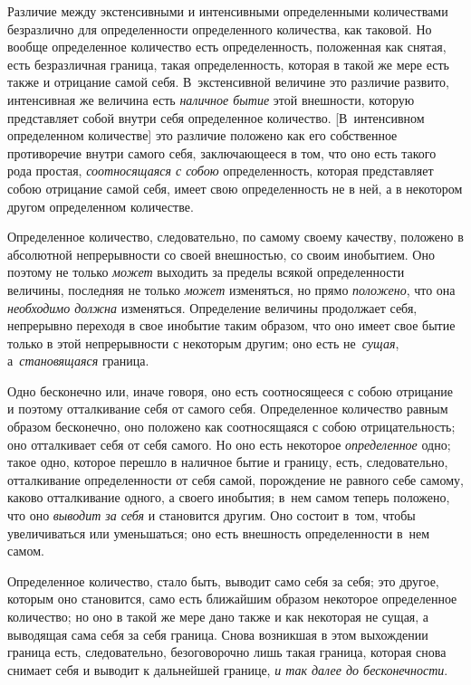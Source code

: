 Различие между экстенсивными и интенсивными определенными количествами
безразлично для определенности определенного количества, как таковой. Но вообще
определенное количество есть определенность, положенная как снятая, есть
безразличная граница, такая определенность, которая в такой же мере есть также
и отрицание самой себя. В~экстенсивной величине это различие развито,
интенсивная же величина есть {\em наличное бытие} этой внешности, которую
представляет собой внутри себя определенное количество. [В~интенсивном
определенном количестве] это различие положено как его собственное противоречие
внутри самого себя, заключающееся в том, что оно есть такого рода простая,
{\em соотносящаяся с собою} определенность, которая представляет собою
отрицание самой себя, имеет свою определенность не в ней, а в некотором другом
определенном количестве.

Определенное количество, следовательно, по самому своему качеству, положено
в абсолютной непрерывности со своей внешностью, со своим инобытием. Оно поэтому
не только {\em может} выходить за пределы всякой определенности величины,
последняя не только {\em может} изменяться, но прямо {\em положено}, что она
{\em необходимо должна} изменяться. Определение величины продолжает себя,
непрерывно переходя в свое инобытие таким образом, что оно имеет свое бытие
только в этой непрерывности с некоторым другим; оно есть не~{\em сущая},
а~{\em становящаяся} граница.

Одно бесконечно или, иначе говоря, оно есть соотносящееся с собою отрицание и
поэтому отталкивание себя от самого себя. Определенное количество равным
образом бесконечно, оно положено как соотносящаяся с собою отрицательность; оно
отталкивает себя от себя самого. Но оно есть некоторое {\em определенное} одно;
такое одно, которое перешло в наличное бытие и границу, есть, следовательно,
отталкивание определенности от себя самой, порождение не равного себе самому,
каково отталкивание одного, а своего инобытия; в~нем самом теперь положено, что
оно {\em выводит за себя} и становится другим. Оно состоит в~том, чтобы
увеличиваться или уменьшаться; оно есть внешность определенности в~нем самом.

Определенное количество, стало быть, выводит само себя за себя; это другое,
которым оно становится, само есть ближайшим образом некоторое определенное
количество; но оно в такой же мере дано также и как некоторая не сущая, а
выводящая сама себя за себя граница. Снова возникшая в этом выхождении граница
есть, следовательно, безоговорочно лишь такая граница, которая снова снимает
себя и выводит к дальнейшей границе, {\em и так далее до бесконечности}.

